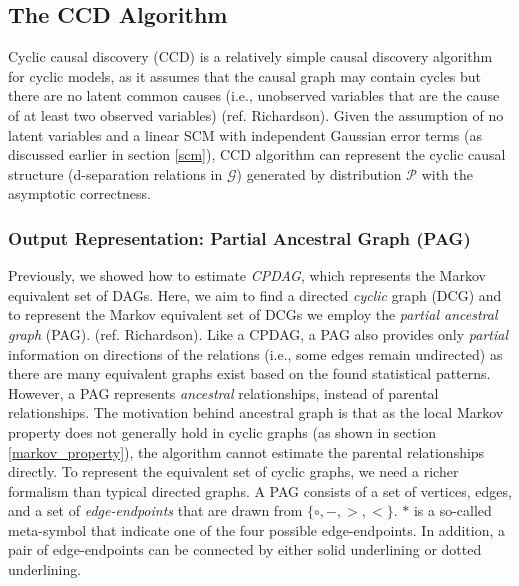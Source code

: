 \documentclass[11pt]{article}
\theoremstyle{definition}
\begin{document}
\subsection{The CCD Algorithm}

Cyclic causal discovery (CCD) is a relatively simple causal discovery algorithm for cyclic models, as it assumes that the causal graph may contain cycles but there are no latent common causes (i.e., unobserved variables that are the cause of at least two observed variables) (ref. Richardson). Given the assumption of no latent variables and a linear SCM with independent Gaussian error terms (as discussed earlier in section \ref{scm}), CCD algorithm can represent the cyclic causal structure (d-separation relations in $\mathcal{G}$) generated by distribution $\mathcal{P}$ with the asymptotic correctness.

\subsubsection{Output Representation: Partial Ancestral Graph (PAG)}
Previously, we showed how to estimate \textit{CPDAG}, which represents the Markov equivalent set of DAGs. Here, we aim to find a directed \textit{cyclic} graph (DCG) and to represent the Markov equivalent set of DCGs we employ the \textit{partial ancestral graph} (PAG). (ref. Richardson). Like a CPDAG, a PAG also provides only \textit{partial} information on directions of the relations (i.e., some edges remain undirected) as there are many equivalent graphs exist based on the found statistical patterns. However, a PAG represents \textit{ancestral} relationships, instead of parental relationships. The motivation behind ancestral graph is that as the local Markov property does not generally hold in cyclic graphs (as shown in section \ref{markov_property}), the algorithm cannot estimate the parental relationships directly. 
To represent the equivalent set of cyclic graphs, we need a richer formalism than typical directed graphs. A PAG consists of a set of vertices, edges, and a set of \textit{edge-endpoints} that are drawn from $\{ \circ, -, >, < \}$. $*$ is a so-called meta-symbol that indicate one of the four possible edge-endpoints. In addition, a pair of edge-endpoints can be connected by either solid underlining or dotted underlining. 
\end{document}

